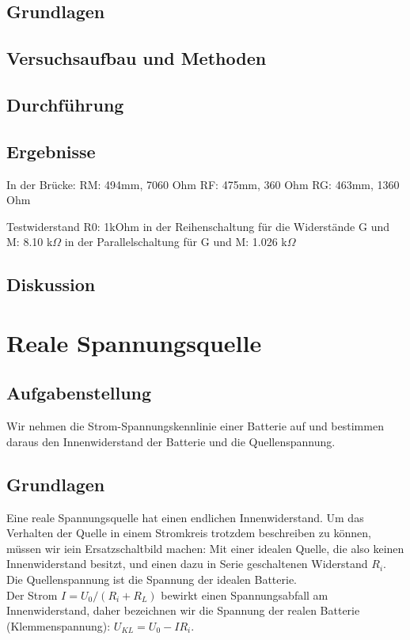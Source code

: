 \documentclass{article}
\begin{document}
\subsection{Grundlagen}
\subsection{Versuchsaufbau und Methoden}
\subsection{Durchführung}
\subsection{Ergebnisse}
In der Brücke:
RM: 494mm, 7060 Ohm
RF: 475mm, 360 Ohm
RG: 463mm, 1360 Ohm

Testwiderstand R0: 1kOhm
in der Reihenschaltung für die Widerstände G und M: 8.10 k$\Omega$
in der Parallelschaltung für G und M: 1.026 k$\Omega$
\subsection{Diskussion}

\section{Reale Spannungsquelle}

\subsection{Aufgabenstellung}
Wir nehmen die Strom-Spannungskennlinie einer Batterie auf und bestimmen daraus den Innenwiderstand der Batterie und die Quellenspannung.


\subsection{Grundlagen}
Eine reale Spannungsquelle hat einen endlichen Innenwiderstand. Um das Verhalten der Quelle in einem Stromkreis trotzdem beschreiben zu können, müssen wir iein Ersatzschaltbild machen: Mit einer idealen Quelle, die also keinen Innenwiderstand besitzt, und einen dazu in Serie geschaltenen Widerstand $R_i$.\\
Die Quellenspannung ist die Spannung der idealen Batterie.\\
Der Strom $I=U_0/(R_i+R_L)$ bewirkt einen Spannungsabfall am Innenwiderstand, daher bezeichnen wir die Spannung der realen Batterie (Klemmenspannung): $U_{KL}=U_0-IR_i$.
\end{document}
